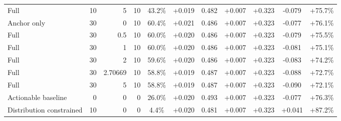 \begin{table}[htbp]
\begin{tabular}{lrrrccccccc}
Full & 10 & 5 & 10 & 43.2\% & +0.019 & 0.482 & +0.007 & +0.323 & -0.079 & +75.7\% \\
Anchor only & 30 & 0 & 10 & 60.4\% & +0.021 & 0.486 & +0.007 & +0.323 & -0.077 & +76.1\% \\
Full & 30 & 0.5 & 10 & 60.0\% & +0.020 & 0.486 & +0.007 & +0.323 & -0.079 & +75.5\% \\
Full & 30 & 1 & 10 & 60.0\% & +0.020 & 0.486 & +0.007 & +0.323 & -0.081 & +75.1\% \\
Full & 30 & 2 & 10 & 59.6\% & +0.020 & 0.486 & +0.007 & +0.323 & -0.083 & +74.2\% \\
Full & 30 & 2.70669 & 10 & 58.8\% & +0.019 & 0.487 & +0.007 & +0.323 & -0.088 & +72.7\% \\
Full & 30 & 5 & 10 & 58.8\% & +0.019 & 0.487 & +0.007 & +0.323 & -0.090 & +72.1\% \\
Actionable baseline & 0 & 0 & 0 & 26.0\% & +0.020 & 0.493 & +0.007 & +0.323 & -0.077 & +76.3\% \\
Distribution constrained & 10 & 0 & 0 & 4.4\% & +0.020 & 0.481 & +0.007 & +0.323 & +0.041 & +87.2\% \\
\bottomrule
\end{tabular}
\end{table}